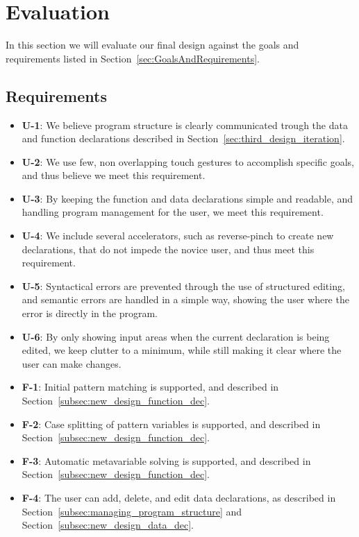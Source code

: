 \chapter{Evaluation}
\label{sec:Evaluation}
In this section we will evaluate our final design against the goals and requirements listed in Section~\ref{sec:GoalsAndRequirements}.

\section{Requirements}
\begin{itemize}
	\item \textbf{U-1}: We believe program structure is clearly communicated trough the data and function declarations described in Section~\ref{sec:third_design_iteration}.
	\item \textbf{U-2}: We use few, non overlapping touch gestures to accomplish specific goals, and thus believe we meet this requirement.
	\item \textbf{U-3}: By keeping the function and data declarations simple and readable, and handling program management for the user, we meet this requirement.
	\item \textbf{U-4}: We include several accelerators, such as reverse-pinch to create new declarations, that do not impede the novice user, and thus meet this requirement.
	\item \textbf{U-5}: Syntactical errors are prevented through the use of structured editing, and semantic errors are handled in a simple way, showing the user where the error is directly in the program.
	\item \textbf{U-6}: By only showing input areas when the current declaration is being edited, we keep clutter to a minimum, while still making it clear where the user can make changes.
	\item \textbf{F-1}: Initial pattern matching is supported, and described in Section~\ref{subsec:new_design_function_dec}.
	\item \textbf{F-2}: Case splitting of pattern variables is supported, and described in Section~\ref{subsec:new_design_function_dec}.
	\item \textbf{F-3}: Automatic metavariable solving is supported, and described in Section~\ref{subsec:new_design_function_dec}.
	\item \textbf{F-4}: The user can add, delete, and edit data declarations, as described in Section~\ref{subsec:managing_program_structure} and Section~\ref{subsec:new_design_data_dec}.

\end{itemize}

